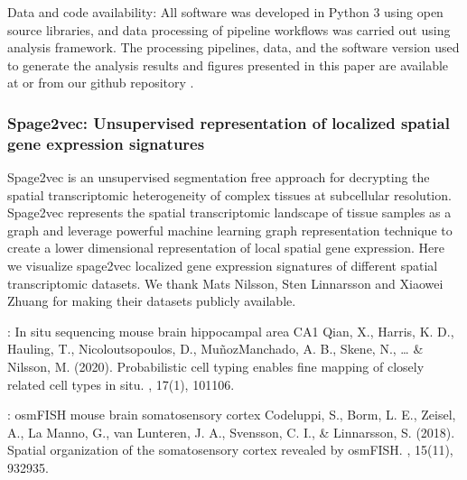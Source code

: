 \documentclass[letterpaper,10pt,english,openany,oneside]{sphinxmanual}
\begin{document}
\sphinxAtStartPar
Data and code availability: All software was developed in Python 3 using open source libraries, and data processing of pipeline workflows was carried out using  analysis framework. The processing pipelines, data, and the software version used to generate the analysis results and figures presented in this paper are available at  or from our github repository .


\subsubsection{Spage2vec: Unsupervised representation of localized spatial gene expression signatures}
\label{\detokenize{docs/starting/projects:spage2vec-unsupervised-representation-of-localized-spatial-gene-expression-signatures}}
\sphinxAtStartPar
Spage2vec is an unsupervised segmentation free approach for decrypting the spatial transcriptomic heterogeneity of complex tissues at subcellular resolution. Spage2vec represents the spatial transcriptomic landscape of tissue samples as a graph and leverage powerful machine learning graph representation technique to create a lower dimensional representation of local spatial gene expression. Here we visualize spage2vec localized gene expression signatures of different spatial transcriptomic datasets. We thank Mats Nilsson, Sten Linnarsson and Xiaowei Zhuang for making their datasets publicly available.

\sphinxAtStartPar
{}

\sphinxAtStartPar
{}: In situ sequencing mouse brain hippocampal area CA1 Qian, X., Harris, K. D., Hauling, T., Nicoloutsopoulos, D., Muñoz\sphinxhyphen{}Manchado, A. B., Skene, N., … \& Nilsson, M. (2020). Probabilistic cell typing enables fine mapping of closely related cell types in situ. , 17(1), 101\sphinxhyphen{}106.

\sphinxAtStartPar
{}: osmFISH mouse brain somatosensory cortex Codeluppi, S., Borm, L. E., Zeisel, A., La Manno, G., van Lunteren, J. A., Svensson, C. I., \& Linnarsson, S. (2018). Spatial organization of the somatosensory cortex revealed by osmFISH. , 15(11), 932\sphinxhyphen{}935.
\end{document}
